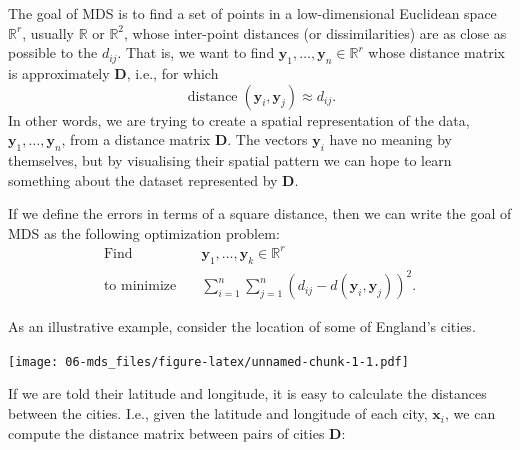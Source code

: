 \documentclass[]{book}
\theoremstyle{definition}
\theoremstyle{definition}
\theoremstyle{definition}
\theoremstyle{remark}
\begin{document}
The goal of MDS is to find a set of points in a low-dimensional Euclidean space \(\mathbb{R}^r\), usually \(\mathbb{R}\) or \(\mathbb{R}^2\), whose inter-point distances (or dissimilarities) are as close as possible to the \(d_{ij}\). That is, we want to find \(\mathbf y_1, \ldots, \mathbf y_n \in \mathbb{R}^r\) whose distance matrix is approximately \(\mathbf D\), i.e., for which
\[\operatorname{distance}(\mathbf y_i, \mathbf y_j) \approx d_{ij}.\]
In other words, we are trying to create a spatial representation of the data, \(\mathbf y_1, \ldots, \mathbf y_n\), from a distance matrix \(\mathbf D\). The vectors \(\mathbf y_i\) have no meaning by themselves, but by visualising their spatial pattern we can hope to learn something about the dataset represented by \(\mathbf D\).

If we define the errors in terms of a square distance, then we can write the goal of MDS as the following optimization problem:
\begin{align}
\mbox{Find} \quad& \mathbf y_1, \ldots, \mathbf y_k \in \mathbb{R}^r\\
\mbox{to minimize} \quad &\sum_{i=1}^n \sum_{j=1}^n (d_{ij} - d(\mathbf y_i, \mathbf y_j))^2.\label{eq:mdsopt}
\end{align}

As an illustrative example, consider the location of some of England's cities.

\texttt{[image: 06-mds\_files/figure-latex/unnamed-chunk-1-1.pdf]}

If we are told their latitude and longitude, it is easy to calculate the distances between the cities. I.e., given the latitude and longitude of each city, \(\mathbf x_i\), we can compute the distance matrix between pairs of cities \(\mathbf D\):
\end{document}
